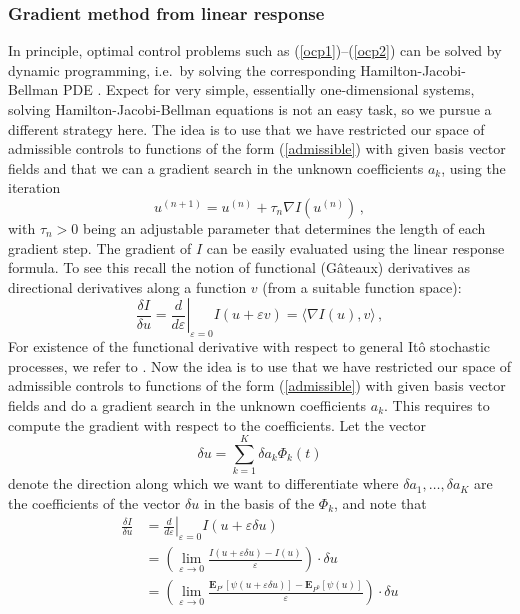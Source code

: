 \documentclass[]{tMPH2e}
\newcommand{\eps}{\varepsilon}
\newcommand{\bE}{{\mathbf E}}
\newcommand{\wrt}{with respect to }
\begin{document}
\subsubsection*{Gradient method from linear response}

In principle, optimal control problems such as (\ref{ocp1})--(\ref{ocp2}) can be solved by dynamic programming, i.e.~by solving the corresponding Hamilton-Jacobi-Bellman PDE \cite{fleming2006}. Expect for very simple, essentially one-dimensional systems, solving Hamilton-Jacobi-Bellman equations is not an easy task, so we pursue a different strategy here. The idea is to use that we have restricted our space of admissible controls to functions of the form (\ref{admissible}) with given basis vector fields and that we can a gradient search in the unknown coefficients $a_{k}$, using the iteration
\[
u^{(n+1)} = u^{(n)} + \tau_{n}\nabla I(u^{(n)})\,,
\]
with $\tau_{n}>0$ being an adjustable parameter that determines the length of each gradient step. The gradient of $I$ can be easily evaluated using the linear response formula. To see this recall the notion of functional (G\^ateaux) derivatives as directional derivatives along a function $v$ (from a suitable function space): 
\begin{equation*}
\frac{\delta I}{\delta u} = \left.\frac{d}{d\eps}\right|_{\eps=0} I(u+\eps v) = \langle\nabla I(u),v\rangle\,,
\end{equation*} 
For existence of the functional derivative \wrt general It\^o stochastic processes, we refer to \cite{bell2006}.  
Now the idea is to use that we have restricted our space of admissible controls to functions of the form (\ref{admissible}) with given basis vector fields and do a gradient search in the unknown coefficients $a_{k}$. This requires to compute the gradient \wrt the coefficients. Let the vector  
\[
\delta u = \sum_{k=1}^K \delta a_k \Phi_k(t)
\]   
denote the direction along which we want to differentiate where $\delta a_{1},\ldots,\delta a_{K}$ are the coefficients of the vector $\delta u$ in the basis of the $\Phi_{k}$, and note that 
\begin{equation*}
\begin{aligned}
\frac{\delta I}{\delta u} & = \left.\frac{d}{d\eps}\right|_{\eps=0} I(u+\eps \delta u)\\
& = \left(\lim_{\eps\to 0}\frac{I(u+\eps\delta u) - I(u)}{\eps}\right)\cdot \delta u\\
& = \left(\lim_{\eps\to 0}\frac{\bE_{P^{\eps}}[\psi(u+\eps \delta u)] - \bE_{P^{0}}[\psi(u)]}{\eps}\right)\cdot\delta u\\
\end{aligned}
\end{equation*} 
\end{document}
